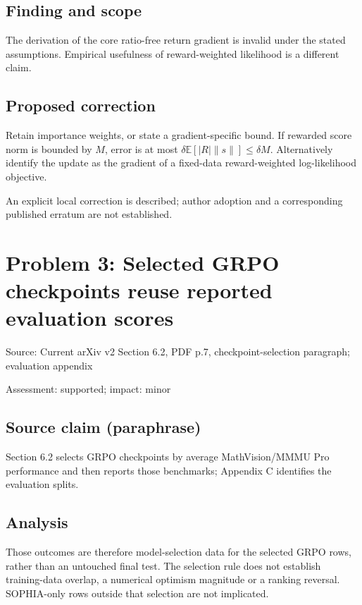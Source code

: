 \documentclass[11pt]{article}
\begin{document}
\subsection*{Finding and scope}

The derivation of the core ratio-free return gradient is invalid under the stated assumptions. Empirical usefulness of reward-weighted likelihood is a different claim.

\subsection*{Proposed correction}

Retain importance weights, or state a gradient-specific bound. If rewarded score norm is bounded by \(M\), error is at most \(\delta\mathbb E[|R|\|s\|]\leq\delta M\). Alternatively identify the update as the gradient of a fixed-data reward-weighted log-likelihood objective.

An explicit local correction is described; author adoption and a corresponding published erratum are not established.

\section*{Problem 3: Selected GRPO checkpoints reuse reported evaluation scores}

Source: Current arXiv v2 Section 6.2, PDF p.7, checkpoint-selection paragraph; evaluation appendix

Assessment: supported; impact: minor

\subsection*{Source claim (paraphrase)}

Section 6.2 selects GRPO checkpoints by average MathVision/MMMU Pro performance and then reports those benchmarks; Appendix C identifies the evaluation splits.

\subsection*{Analysis}

Those outcomes are therefore model-selection data for the selected GRPO rows, rather than an untouched final test. The selection rule does not establish training-data overlap, a numerical optimism magnitude or a ranking reversal. SOPHIA-only rows outside that selection are not implicated.
\end{document}

